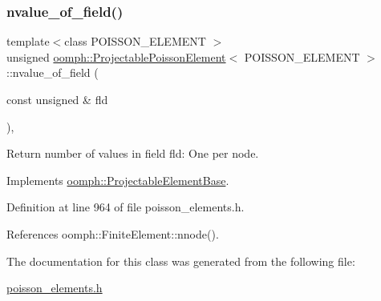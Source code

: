 \subsubsection{\texorpdfstring{nvalue\+\_\+of\+\_\+field()}{nvalue\_of\_field()}}
{\footnotesize\ttfamily template$<$class P\+O\+I\+S\+S\+O\+N\+\_\+\+E\+L\+E\+M\+E\+NT $>$ \\
unsigned \hyperlink{classoomph_1_1ProjectablePoissonElement}{oomph\+::\+Projectable\+Poisson\+Element}$<$ P\+O\+I\+S\+S\+O\+N\+\_\+\+E\+L\+E\+M\+E\+NT $>$\+::nvalue\+\_\+of\+\_\+field (\begin{DoxyParamCaption}\item[{const unsigned \&}]{fld }\end{DoxyParamCaption})\hspace{0.3cm}{\ttfamily [inline]}, {\ttfamily [virtual]}}



Return number of values in field fld\+: One per node. 



Implements \hyperlink{classoomph_1_1ProjectableElementBase_a1a9a6de16f3511bca8e8be770abb9c2e}{oomph\+::\+Projectable\+Element\+Base}.



Definition at line 964 of file poisson\+\_\+elements.\+h.



References oomph\+::\+Finite\+Element\+::nnode().



The documentation for this class was generated from the following file\+:\begin{DoxyCompactItemize}
\item 
\hyperlink{poisson__elements_8h}{poisson\+\_\+elements.\+h}\end{DoxyCompactItemize}
